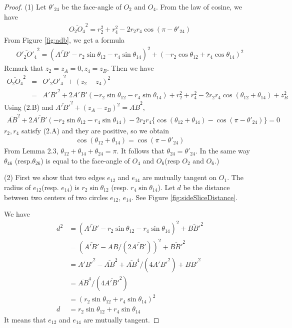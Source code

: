 \documentclass[suppldata, dvipdfmx]{interact}
\theoremstyle{plain}%
\theoremstyle{definition}
\theoremstyle{remark}
\theoremstyle{problemstyle}
\begin{document}
 
\begin{proof}
 (1) Let $\theta'_{24}$ be the face-angle of $O_2$ and $O_4$. From the
 law of cosine, we have
 \begin{eqnarray}
  \overline{O_2O_4}^2 = r_2^2 + r_4^2 - 2r_2r_4\cos(\pi-\theta'_{24})
 \end{eqnarray}
From Figure \ref{fig:adb}, we get a formula
\begin{eqnarray*}
 \overline{O'_2O'_4}^2 = (\overline{A'B'} - r_2\sin\theta_{12}-
  r_4\sin\theta_{14})^2 + (-r_2\cos\theta_{12} + r_4 \cos \theta_{14})^2
\end{eqnarray*}
 Remark that $z_2 = z_A= 0, z_4 = z_B$. Then we have
\begin{eqnarray*}
 \overline{O_2O_4}^2 &=& \overline{O'_2O'_4}^2 + (z_2-z_4)^2\\
 &=&\overline{A'B'}^2 + 2 \overline{A'B'}(-r_2\sin\theta_{12} -
  r_4\sin\theta_{14}) + r^2_2 + r^2_4 -2r_2r_4\cos(\theta_{12} +
  \theta_{14}) + z^2_B
\end{eqnarray*}
Using (2.B) and $\overline{A'B'}^2 + (z_A-z_B)^2 = \overline{AB}^2$,
\begin{eqnarray*}
 \overline{AB}^2 + 2\overline{A'B'}(-r_2\sin\theta_{12} -
  r_4\sin\theta_{14}) - 2r_2r_4\{\cos(\theta_{12} + \theta_{14}) -
  \cos(\pi- \theta'_{24})\} = 0
\end{eqnarray*}
 $r_2, r_4$ satisfy (2.A) and they are positive, so we obtain
\begin{eqnarray*}
 \cos(\theta_{12} + \theta_{14}) = \cos(\pi - \theta'_{24})
\end{eqnarray*}
From Lemma 2.3, $\theta_{12} + \theta_{14} + \theta_{24} = \pi$. It
 follows that $\theta_{24} = \theta'_{24}$. In the same way $\theta_{46}$
 (resp.$\theta_{26}$) is equal to the face-angle of $O_4$ and $O_6$(resp
 $O_2$ and $O_6$.)

(2) First we show that two edges $e_{12}$ and $e_{14}$ are mutually tangent
 on $O_1$. The radius of $e_{12}$(resp. $e_{14}$) is
 $r_2\sin\theta_{12}$ (resp. $r_4\sin\theta_{14}$). Let $d$ be the
 distance between two centers of two circles $e_{12}$, $e_{14}$. See
 Figure \ref{fig:sideSliceDistance}.

We have
 \begin{align*}
d^2&= (\overline{A'B'} - r_2\sin\theta_{12}-r_4\sin\theta_{14})^2 + \overline{BB'}^2\\
&= (\overline{A'B'} - \overline{AB}/(2\overline{A'B'}))^2 + \overline{BB'}^2\\
&= \overline{A'B'}^2 - \overline{AB}^2
  +\overline{AB}^4/(4\overline{A'B'}^2) + \overline{BB'}^2\\
&= \overline{AB}^4 / (4 \overline{A'B'}^2)\\
&=(r_2\sin\theta_{12} + r_4\sin\theta_{14})^2\\
d&= r_2\sin\theta_{12} + r_4\sin\theta_{14}
 \end{align*}
It means that $e_{12}$ and $e_{14}$ are mutually tangent.


\end{proof}
\end{document}
